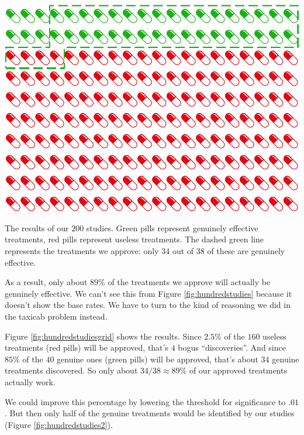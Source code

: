 \documentclass[justified]{tufte-book}
\theoremstyle{definition}
\theoremstyle{definition}
\theoremstyle{definition}
\theoremstyle{remark}
\begin{document}
\begin{marginfigure}
\includegraphics{_main_files/figure-latex/hundredstudiesgrid-1} \caption[The results of our $200$ studies]{The results of our $200$ studies. Green pills represent genuinely effective treatments, red pills represent useless treatments. The dashed green line represents the treatments we approve: only $34$ out of $38$ of these are genuinely effective.}\label{fig:hundredstudiesgrid}
\end{marginfigure}

As a result, only about \(89\%\) of the treatments we approve will actually be genuinely effective. We can't see this from Figure \ref{fig:hundredstudies} because it doesn't show the base rates. We have to turn to the kind of reasoning we did in the taxicab problem instead.

Figure \ref{fig:hundredstudiesgrid} shows the results. Since \(2.5\%\) of the \(160\) useless treatments (red pills) will be approved, that's \(4\) bogus ``discoveries''. And since \(85\%\) of the \(40\) genuine ones (green pills) will be approved, that's about \(34\) genuine treatments discovered. So only about \(34/38 \approx 89\%\) of our approved treatments actually work.

We could improve this percentage by lowering the threshold for significance to \(.01\). But then only half of the genuine treatments would be identified by our studies (Figure \ref{fig:hundredstudies2}).
\end{document}

